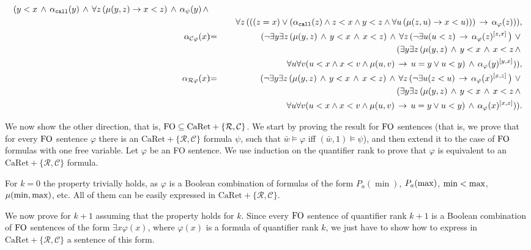 \documentclass{LMCS}
\newcommand{\M}{{\mu}}
\newcommand{\w}{{\bar{w}}}
\newcommand{\C}{{\mathcal{C}}}
\newcommand{\R}{{\mathcal{R}}}
\newcommand{\FO}{{\rm FO}}
\renewcommand{\phi}{\varphi}
\theoremstyle{plain}
\theoremstyle{definition}
\newcommand{\caret}{\text{CaRet}}
\newcommand{\call}{{\tt call}}
\begin{document}
{{\begin{eqnarray*}
(y < x \,\wedge\, \alpha_\call(y) \,\wedge\, 
\forall z\,(\M(y,z) \rightarrow x < z) 
\,\wedge\, \alpha_\psi(y) \,\wedge\, \\ 
&& \ \ \ \ \ \forall z\,(((z = x) \vee (\alpha_\call(z) \wedge z < x
\wedge y < z \wedge \forall u\,(\M(z,u) \rightarrow x < u)))
\,\rightarrow\, \alpha_\varphi(z))) ,\\  
\alpha_{\C \varphi}(x) &\!\!\!:=\!\!\!&
(\neg \exists y \exists z \,(\M(y,z) \,\wedge\, y <
x \,\wedge\, x < z) \,\wedge\, \forall z \,(\neg \exists u (u < z)
\,\rightarrow\, \alpha_\varphi(z)^{[z,x]}\,\big) \,\,\vee\, \\
&& \ \ \ (\exists y \exists z \,(\M(y,z) \,\wedge\, y <
x \,\wedge\, x < z \,\wedge\, \\
&& \ \ \ \ \ \ \ \ \ \ \ \ \ \ \ \ \ \
\forall u \forall v (u < x \wedge
x < v \wedge \M(u,v) \,\rightarrow\, u = y \vee u < y) \,\wedge\,
\alpha_\varphi(y)^{[y,x]})), \\ 
\alpha_{\R \varphi}(x) &\!\!\!:=\!\!\!&
(\neg \exists y \exists z \,(\M(y,z) \,\wedge\, y <
x \,\wedge\, x < z) \,\wedge\, \forall z \,(\neg \exists u (z < u)
\,\rightarrow\, \alpha_\varphi(x)^{[x,z]}\,\big) \,\,\vee\, \\
&& \ \ \ (\exists y \exists z \,(\M(y,z) \,\wedge\, y <
x \,\wedge\, x < z \,\wedge\, \\
&& \ \ \ \ \ \ \ \ \ \ \ \ \ \ \ \ \ \
\forall u \forall v (u < x \wedge
x < v \wedge \M(u,v) \,\rightarrow\, u = y \vee u < y) \,\wedge\,
\alpha_\varphi(x)^{[x,z]})). 
\end{eqnarray*}}


We now show the other direction, that is, $ \FO \subseteq
\caret+\{\R,\C\}$.  We start by proving the result for $\FO$ sentences
(that is, we prove that for every $\FO$ sentence $\varphi$ there is an
$\caret+\{\R,\C\}$ formula $\psi$, such that $\w \models \varphi$ iff
$(\w,1) \models \psi$), and then extend it to the case of $\FO$
formulas with one free variable.  Let $\phi$ be an FO sentence. We use
induction on the quantifier rank to prove that $\phi$ is equivalent to
an $\caret+\{\R,\C\}$ formula.

For $k = 0$ the property trivially holds, as $\phi$ is a Boolean
combination of formulas of the form $P_a(\min)$, $P_a({\rm max})$, ${\rm min} <
{\rm max}$, $\M(\min,\maxx)$, etc. All of them can be easily expressed in
$\caret+\{\R,\C\}$.

We now prove for $k + 1$ assuming that the property holds for $k$.
Since every $\FO$ sentence of quantifier rank $k+1$ is a Boolean
combination of $\FO$ sentences of the form $\exists x \phi(x)$, where
$\phi(x)$ is a formula of quantifier rank $k$, we just have to show
how to express in $\caret+\{\R,\C\}$ a sentence of this form.

}
\end{document}
